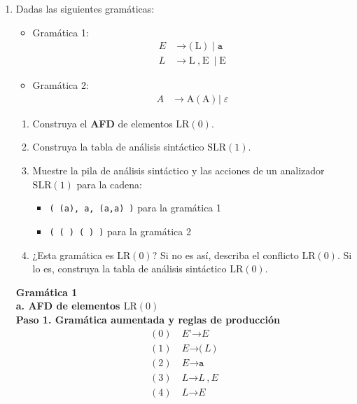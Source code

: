 \documentclass[12pt,letterpaper]{article}
\newcommand{\nt}[1]{\textit{#1}}
\newcommand{\tk}[1]{\texttt{#1}}
\newcommand{\tx}[1]{\text{#1}}
\newcommand{\lrc}{\mathrm{LR(0)}}
\newcommand{\slr}{\mathrm{SLR(1)}}
\newcommand{\eps}{\varepsilon}
\begin{document}
\begin{enumerate}[label=\arabic*.]
\item Dadas las siguientes gramáticas:
  \begin{itemize}
  \item Gramática 1:
    \[
    \begin{aligned}
      \nt{E} &\to \tk{(}\ \tx{L}\ \tk{)}\ \mid \tk{a} \\
      \nt{L} &\to \tx{L}\ \tk{,}\ \tx{E}\ \mid \tx{E}
    \end{aligned}
    \]
    
  \item Gramática 2:
    \[
    \begin{aligned}
      \nt{A} &\to \tx{A}\ \tk{(}\ \tx{A}\ \tk{)} \mid \eps
    \end{aligned}
    \]
  \end{itemize}

  \begin{enumerate}[label=\alph*.]
    \item Construya el \textbf{AFD} de elementos $\lrc$.
    \item Construya la tabla de análisis sintáctico $\slr$.
    \item Muestre la pila de análisis sintáctico y las acciones de un analizador $\slr$ para la cadena:
      \begin{itemize}
      \item \tk{(}\ \tk{(a),}\ \tk{a,}\ \tk{(a,a)}\ \tk{)}\; para la gramática 1
        
      \item \tk{(}\ \tk{(}\ \tk{)}\ \tk{(}\ \tk{)}\ \tk{)}\; para la gramática 2
      \end{itemize}
      
    \item ¿Esta gramática es $\lrc$? Si no es así, describa el conflicto $\lrc$. Si lo es, construya la tabla de
      análisis sintáctico $\lrc$.
  \end{enumerate}
  
  \bigskip
  
  \textbf{\Large Gramática 1}\\

  \textbf{\large a. AFD de elementos $\lrc$}\\

  \textbf{Paso 1. Gramática aumentada y reglas de producción}
  \[
  \begin{aligned}
    (0)\ & \nt{E'} \to \nt{E} \\
    (1)\ & \nt{E} \to \tk{(}\,\nt{L}\,\tk{)} \\
    (2)\ & \nt{E} \to \tk{a} \\
    (3)\ & \nt{L} \to \nt{L}\,\tk{,}\,\nt{E} \\
    (4)\ & \nt{L} \to \nt{E}
  \end{aligned}
  \]


\end{enumerate}
\end{document}
